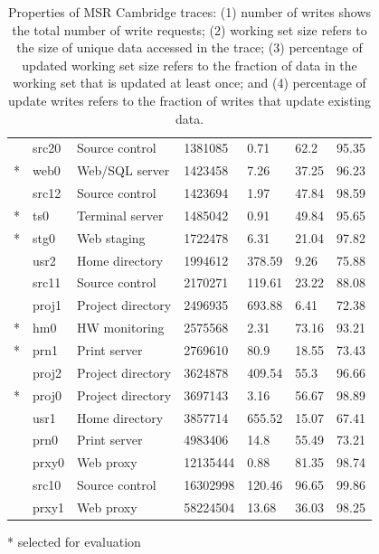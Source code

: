 \begin{table}[t]
{\begin{tabular}{L{0.2cm}L{1.2cm}L{2.5cm}P{1.8cm}P{1.9cm}P{1.5cm}P{1.6cm}}
      & src20  & Source control       & 1381085   & 0.71     & 62.2   & 95.35 \\
    * & web0   & Web/SQL server       & 1423458   & 7.26     & 37.25  & 96.23 \\
      & src12  & Source control       & 1423694   & 1.97     & 47.84  & 98.59 \\
    * & ts0    & Terminal server      & 1485042   & 0.91     & 49.84  & 95.65 \\
    * & stg0   & Web staging          & 1722478   & 6.31     & 21.04  & 97.82 \\
      & usr2   & Home directory       & 1994612   & 378.59   & 9.26   & 75.88 \\
      & src11  & Source control       & 2170271   & 119.61   & 23.22  & 88.08 \\
      & proj1  & Project directory  & 2496935   & 693.88   & 6.41   & 72.38 \\
    * & hm0    & HW monitoring        & 2575568   & 2.31     & 73.16  & 93.21 \\
    * & prn1   & Print server         & 2769610   & 80.9     & 18.55  & 73.43 \\
      & proj2  & Project directory    & 3624878   & 409.54   & 55.3   & 96.66 \\
    * & proj0  & Project directory    & 3697143   & 3.16     & 56.67  & 98.89 \\
      & usr1   & Home directory     & 3857714   & 655.52   & 15.07  & 67.41 \\
      & prn0   & Print server         & 4983406   & 14.8     & 55.49  & 73.21 \\
      & prxy0  & Web proxy   & 12135444  & 0.88     & 81.35  & 98.74 \\
      & src10  & Source control       & 16302998  & 120.46   & 96.65  & 99.86 \\
      & prxy1  & Web proxy   & 58224504  & 13.68    & 36.03  & 98.25 \\
    \bottomrule
    \end{tabular}
    * selected for evaluation
	\caption{Properties of MSR Cambridge traces: (1) number of writes
		shows the total number of write requests; (2) working set size refers to
		the size of unique data accessed in the trace; 
		(3) percentage of updated working set
		size refers to the fraction of data in the working set that is updated
		at least once; and (4) percentage of update writes refers to the
		fraction of writes that update existing data.}
\label{table:msr}
}
\end{table}

